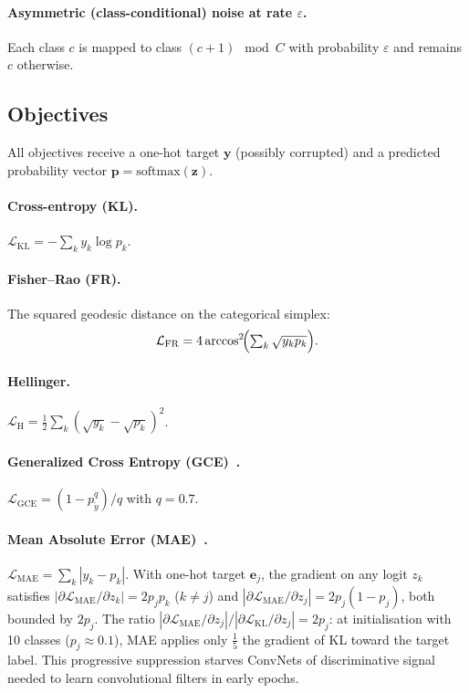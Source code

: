 \documentclass[11pt]{article}
\begin{document}
\paragraph{Asymmetric (class-conditional) noise at rate $\varepsilon$.}
Each class $c$ is mapped to class $(c+1)\!\mod C$ with probability $\varepsilon$
and remains $c$ otherwise.

\subsection{Objectives}

All objectives receive a one-hot target $\mathbf{y}$ (possibly corrupted) and
a predicted probability vector $\mathbf{p} = \mathrm{softmax}(\mathbf{z})$.

\paragraph{Cross-entropy (KL).}
$\mathcal{L}_\mathrm{KL} = -\sum_k y_k \log p_k$.

\paragraph{Fisher--Rao (FR).}
The squared geodesic distance on the categorical simplex:
\[
  \mathcal{L}_\mathrm{FR} = 4\arccos^2\!\Bigl(\textstyle\sum_k \sqrt{y_k p_k}\Bigr).
\]

\paragraph{Hellinger.}
$\mathcal{L}_\mathrm{H} = \tfrac{1}{2}\sum_k (\sqrt{y_k} - \sqrt{p_k})^2$.

\paragraph{Generalized Cross Entropy (GCE)~\citep{zhang2018generalized}.}
$\mathcal{L}_\mathrm{GCE} = (1 - p_{\tilde{y}}^q)/q$ with $q=0.7$.

\paragraph{Mean Absolute Error (MAE)~\citep{ghosh2017robust}.}
$\mathcal{L}_\mathrm{MAE} = \sum_k |y_k - p_k|$.
With one-hot target $\mathbf{e}_j$, the gradient on any logit $z_k$ satisfies
$|\partial\mathcal{L}_\mathrm{MAE}/\partial z_k| = 2p_j p_k$ ($k \neq j$) and
$|\partial\mathcal{L}_\mathrm{MAE}/\partial z_j| = 2p_j(1-p_j)$, both bounded by $2p_j$.
The ratio $|\partial\mathcal{L}_\mathrm{MAE}/\partial z_j|/|\partial\mathcal{L}_\mathrm{KL}/\partial z_j| = 2p_j$:
at initialisation with 10 classes ($p_j \approx 0.1$), MAE applies only $\tfrac{1}{5}$ the
gradient of KL toward the target label.
This progressive suppression starves ConvNets of discriminative signal needed
to learn convolutional filters in early epochs.
\end{document}

